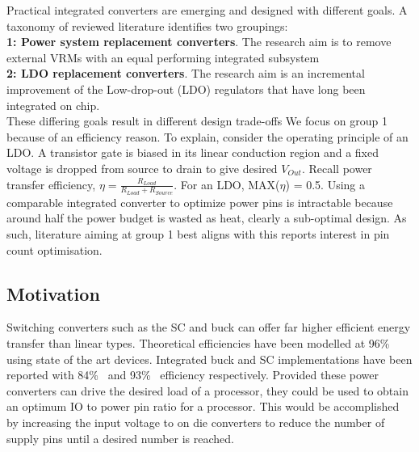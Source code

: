 \documentclass[letterpaper,twocolumn,10pt]{article}
\begin{document}
Practical integrated converters are emerging and designed with different goals. A taxonomy of reviewed literature identifies two groupings:\\
\textbf{1: Power system replacement converters}. The research aim is to remove external VRMs with an equal performing integrated subsystem\\
\textbf{2: LDO replacement converters}. The research aim is an incremental improvement of the Low-drop-out (LDO) regulators that have long been integrated on chip.\\
These differing goals result in different design trade-offs We focus on group 1 because of an efficiency reason. To explain, consider the operating principle of an LDO. A transistor gate is biased in its linear conduction region and a fixed voltage is dropped from source to drain to give desired $V_{Out}$. Recall power transfer efficiency, $\eta = \frac{R_{Load}}{R_{Load} + R_{Source}}$. For an LDO, MAX($\eta$) = 0.5. Using a comparable integrated converter to optimize power pins is intractable because around half the power budget is wasted as heat, clearly a sub-optimal design. As such, literature aiming at group 1 best aligns with this reports interest in pin count optimisation.\\  

\subsection{Motivation}
Switching converters such as the SC and buck can offer far higher efficient energy transfer than linear types. Theoretical efficiencies have been modelled at 96\%~\cite{Rodriguez2014} using state of the art devices. Integrated buck and SC implementations have been reported with 84\%~\cite{Cheng2013} and 93\%~\cite{Damak2013} efficiency respectively. Provided these power converters can drive the desired load of a processor, they could be used to obtain an optimum IO to power pin ratio for a processor. This would be accomplished by increasing the input voltage to on die converters to reduce the number of supply pins until a desired number is reached.  
\end{document}
